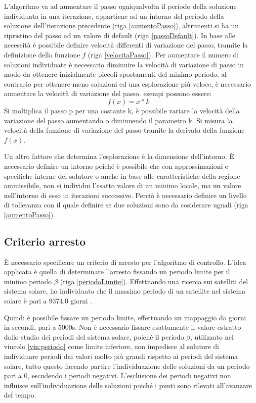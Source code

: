 \documentclass[a4paper,12pt]{report}
\begin{document}
L'algoritmo va ad aumentare il passo ogniqualvolta il periodo della soluzione individuata in una iterazione, appartiene ad un intorno del periodo della soluzione dell'iterazione precedente (riga \ref{aumentoPasso}), altrimenti si ha un ripristino del passo ad un valore di default (riga \ref{passoDefault}). In base alle necessità è possibile definire velocità differenti di variazione del passo, tramite la definizione della funzione $f$ (riga \ref{velocitaPasso}). Per aumentare il numero di soluzioni individuate è necessario diminuire la velocità di variazione di passo in modo da ottenere inizialmente piccoli spostamenti del minimo periodo, al contrario per ottenere meno soluzioni ed una esplorazione più veloce, è necessario aumentare la velocità di variazione del passo. esempi possono essere:
\begin{equation}
  \label{velocitaPassoEspl}
f(x) = x * k
\end{equation}
Si moltiplica il passo p per una costante k, è possibile variare la velocità della variazione del passo aumentando o diminuendo il parametro k. Si misura la velocità della funzione di variazione del passo tramite la derivata della funzione $f(x)$.

Un altro fattore che determina l'esplorazione è la dimensione dell'intorno. È necessario definire un intorno poiché è possibile che con approssimazioni e specifiche interne del solutore o anche in base alle caratteristiche della regione ammissibile, non si individui l'esatto valore di un minimo locale, ma un valore nell'intorno di esso in iterazioni successive. Perciò è necessario definire un livello di tolleranza con il quale definire se due soluzioni sono da cosiderare uguali (riga \ref{aumentoPasso}).


\subsection{Criterio arresto }
\label{ss:arresto}
È necessario specificare un criterio di arresto per l'algoritmo di controllo. L'idea applicata è quella di determinare l'arresto fissando un periodo limite per il minimo periodo $ \beta $ (riga \ref{periodoLimite}). Effettuando una ricerca sui satelliti del sistema solare, ho individuato che il massimo periodo di un satellite nel sistema solare è pari a 9374.0 giorni \cite{nasa}.

Quindi è possibile fissare un periodo limite, effettuando un mappaggio da giorni in secondi, pari a 5000s.
Non è necessario fissare esattamente il valore estratto dallo studio dei periodi del sistema solare, poiché il periodo $ \beta $, utilizzato nel vincolo \eqref{vin:periodo}  come limite inferiore, non impedisce al solutore di individuare periodi dai valori molto più grandi rispetto ai periodi del sistema solare, tutto questo facendo partire l'individuazione delle soluzioni da un periodo pari a 0, escudendo i periodi negativi. L'esclusione dei periodi negativi non influisce sull'individuazione delle soluzioni poiché i punti sono rilevati all'avanzare del tempo.
\end{document}
